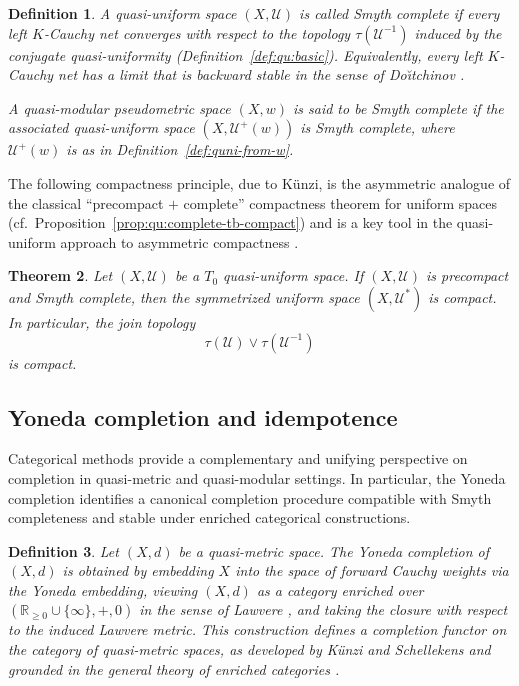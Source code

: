 \documentclass[preprint,12pt]{elsarticle}
\newtheorem{theorem}{Theorem}[section]
\newtheorem{definition}[theorem]{Definition}
\begin{document}
\begin{definition}
\label{def:smyth-complete}
A quasi-uniform space $(X,\mathcal U)$ is called \emph{Smyth complete} if
every left $K$-Cauchy net converges with respect to the topology
$\tau(\mathcal U^{-1})$ induced by the conjugate quasi-uniformity
(Definition~\ref{def:qu:basic}). Equivalently, every left $K$-Cauchy net
has a limit that is backward stable in the sense of Do\u{\i}tchinov
\cite{Doitchinov1991}.

A quasi-modular pseudometric space $(X,w)$ is said to be \emph{Smyth
complete} if the associated quasi-uniform space $(X,\mathcal U^{+}(w))$
is Smyth complete, where $\mathcal U^{+}(w)$ is as in
Definition~\ref{def:quni-from-w}.
\end{definition}

\noindent
The following compactness principle, due to K\"unzi, is the asymmetric
analogue of the classical ``precompact $+$ complete'' compactness theorem
for uniform spaces (cf.\ Proposition~\ref{prop:qu:complete-tb-compact})
and is a key tool in the quasi-uniform approach to asymmetric
compactness \cite{FletcherLindgren,Kunzi2001}.

\begin{theorem}
\label{thm:precompact-smyth-compact}
Let $(X,\mathcal U)$ be a $T_0$ quasi-uniform space. If $(X,\mathcal U)$
is precompact and Smyth complete, then the symmetrized uniform space
$(X,\mathcal U^{*})$ is compact. In particular, the join topology
\[
\tau(\mathcal U)\vee\tau(\mathcal U^{-1})
\]
is compact.
\end{theorem}

\subsection{Yoneda completion and idempotence}
\label{ssec:yoneda}

Categorical methods provide a complementary and unifying perspective on
completion in quasi-metric and quasi-modular settings. In particular,
the Yoneda completion identifies a canonical completion procedure
compatible with Smyth completeness and stable under enriched categorical
constructions.

\begin{definition}
\label{def:yoneda-completion}
Let $(X,d)$ be a quasi-metric space. The \emph{Yoneda completion} of
$(X,d)$ is obtained by embedding $X$ into the space of forward Cauchy
weights via the Yoneda embedding, viewing $(X,d)$ as a category enriched
over $(\mathbb{R}_{\ge 0}\cup\{\infty\},+,0)$ in the sense of Lawvere
\cite{Lawvere1973}, and taking the closure with respect to the induced
Lawvere metric. This construction defines a completion functor on the
category of quasi-metric spaces, as developed by K\"unzi and Schellekens
\cite{KunziSchellekens2002} and grounded in the general theory of
enriched categories \cite{Kelly1982}.
\end{definition}
\end{document}
